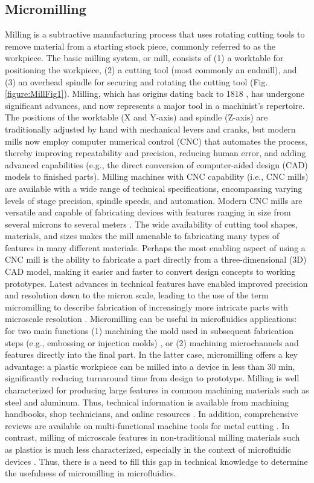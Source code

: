 \subsection{Micromilling}
Milling is a subtractive manufacturing process that uses rotating cutting tools to remove material from a starting stock piece, commonly referred to as the workpiece. The basic milling system, or mill, consists of (1) a worktable for positioning the workpiece, (2) a cutting tool (most commonly an endmill), and (3) an overhead spindle for securing and rotating the cutting tool (Fig. \ref{figure:MillFig1}). Milling, which has origins dating back to 1818 \cite{Woodbury1974}, has undergone significant advances, and now represents a major tool in a machinist's repertoire. The positions of the worktable (X and Y-axis) and spindle (Z-axis) are traditionally adjusted by hand with mechanical levers and cranks, but modern mills now employ computer numerical control (CNC) that automates the process, thereby improving repeatability and precision, reducing human error, and adding advanced capabilities (e.g., the direct conversion of computer-aided design (CAD) models to finished parts). 
Milling machines with CNC capability (i.e., CNC mills) are available with a wide range of technical specifications, encompassing varying levels of stage precision, spindle speeds, and automation. Modern CNC mills are versatile and capable of fabricating devices with features ranging in size from several microns to several meters \cite{Auric2012}. The wide availability of cutting tool shapes, materials, and sizes \cite{Friedrich1996a} makes the mill amenable to fabricating many types of features in many different materials. Perhaps the most enabling aspect of using a CNC mill is the ability to fabricate a part directly from a three-dimensional (3D) CAD model, making it easier and faster to convert design concepts to working prototypes. Latest advances in technical features have enabled improved precision and resolution down to the micron scale, leading to the use of the term micromilling to describe fabrication of increasingly more intricate parts with microscale resolution \cite{Bang2005}. 
Micromilling can be useful in microfluidics applications: for two main functions (1) machining the mold used in subsequent fabrication steps (e.g., embossing or injection molds) \cite{Wilson2011,Okagbare2010}, or (2) machining microchannels and features directly into the final part. In the latter case, micromilling offers a key advantage: a plastic workpiece can be milled into a device in less than 30 min, significantly reducing turnaround time from design to prototype. 
Milling is well characterized for producing large features in common machining materials such as steel and aluminum. Thus, technical information is available from machining handbooks, shop technicians, and online resources \cite{Chi-Hsiang2013}. In addition, comprehensive reviews are available on multi-functional machine tools for metal cutting \cite{Moriwaki2008}. In contrast, milling of microscale features in non-traditional milling materials such as plastics is much less characterized, especially in the context of microfluidic devices \cite{Chen2014}. Thus, there is a need to fill this gap in technical knowledge to determine the usefulness of micromilling in microfluidics.

